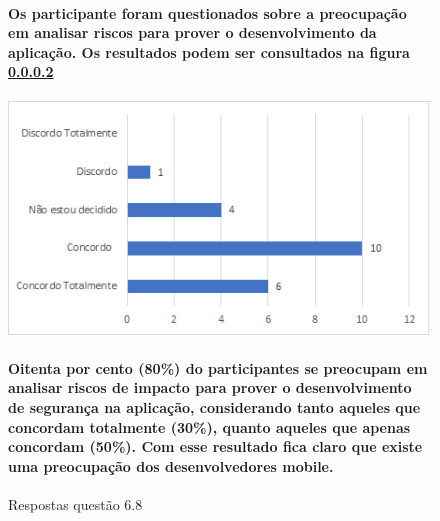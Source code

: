 \begin{figure}[!t]
\centering
\paragraph{Os participante foram questionados sobre a preocupação em analisar riscos para prover o desenvolvimento da aplicação. Os resultados podem ser consultados na figura \ref{fig:6.8}}
\includegraphics[scale=0.7]{figuras das questoes/6.8.png}
\caption{Respostas questão 6.8}
\paragraph{Oitenta por cento (80{\%}) do participantes se preocupam em analisar riscos de impacto para prover o desenvolvimento de segurança na aplicação, considerando tanto aqueles que concordam totalmente (30{\%}), quanto aqueles que apenas concordam (50{\%}). Com esse resultado fica claro que existe uma preocupação dos desenvolvedores mobile. }
\label{fig:6.8}
\end{figure}
